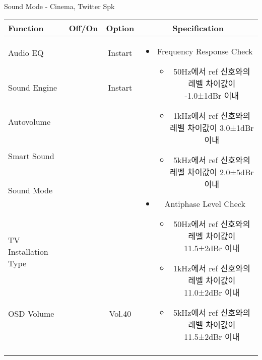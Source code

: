 \begin{frame}[t]{Sound Mode - Cinema, Twitter Spk}
\begin{tiny}
\begin{tabular}{@{}lccc@{}}
\toprule
Function & Off/On & Option & Specification \\
\midrule
Audio EQ & \color{black}{Off} & Instart &
\multirow{10}{60mm}{
\begin{itemize}
\item Frequency Response Check
	\begin{itemize}
	\item 50Hz에서 ref 신호와의 레벨 차이값이 -1.0±1dBr 이내
	\item 1kHz에서 ref 신호와의 레벨 차이값이 3.0±1dBr 이내	
	\item 5kHz에서 ref 신호와의 레벨 차이값이 2.0±5dBr 이내
	\end{itemize}
\item Antiphase Level Check
	\begin{itemize}
	\item 50Hz에서 ref 신호와의 레벨 차이값이 11.5±2dBr 이내
	\item 1kHz에서 ref 신호와의 레벨 차이값이 11.0±2dBr 이내
	\item 5kHz에서 ref 신호와의 레벨 차이값이 11.5±2dBr 이내
	\end{itemize}
\end{itemize}
} \\
Sound Engine & \color{blue}{On} & Instart & \\
Autovolume & \color{black}{Off} & & \\
Smart Sound & \color{black}{Off} & & \\
Sound Mode & \color{blue}{On} & \color{blue}{Cinema} & \\
TV Installation Type & \color{blue}{On} & \color{black}{Standtype1} & \\
OSD Volume & \color{blue}{On} & Vol.40 & \\
& & & \\
& & & \\
& & & \\
& & & \\
\midrule
\end{tabular}
\end{tiny}


\end{frame}